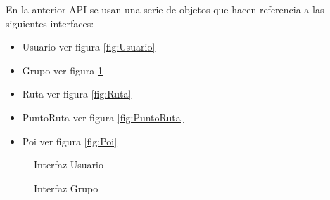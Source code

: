En la anterior API se usan una serie de objetos que hacen referencia a las siguientes interfaces:
\begin{itemize}
 \item Usuario ver figura \ref{fig:Usuario}
 \item Grupo ver figura \ref{fig:Grupo}
 \item Ruta ver figura \ref{fig:Ruta}
 \item PuntoRuta ver figura \ref{fig:PuntoRuta}
 \item Poi ver figura \ref{fig:Poi}
\end{itemize}





































\begin{figure}[H]
\begin{minipage}[b]{0.5\linewidth}
\centering
{}
\caption{ Interfaz Usuario}
\label{fig:Usuario}
\end{minipage}
\begin{minipage}[b]{0.5\linewidth}
\centering
{}
\caption{ Interfaz Grupo}
\label{fig:Grupo}
\end{minipage}
\end{figure}




